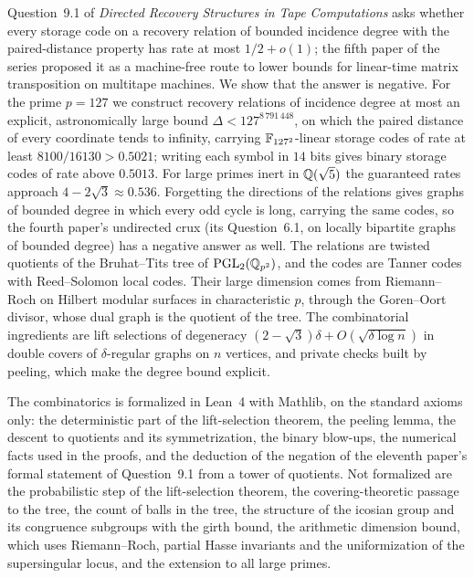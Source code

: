 Question~9.1 of \emph{Directed Recovery Structures in Tape Computations} asks whether every storage code on a recovery
relation of bounded incidence degree with the paired-distance property has rate at most $1/2+o(1)$; the fifth paper of
the series proposed it as a machine-free route to lower bounds for linear-time matrix transposition on multitape
machines. We show that the answer is negative. For the prime $p=127$ we construct recovery relations of incidence degree at
most an explicit, astronomically large bound $\Delta<127^{8\,791\,448}$, on which the paired distance of every coordinate
tends to infinity, carrying $\mathbb{F}_{127^2}$-linear storage codes of rate at least $8100/16130>0.5021$; writing each symbol in
$14$ bits gives binary storage codes of rate above $0.5013$. For large primes inert in $\mathbb{Q}(\sqrt5)$ the guaranteed rates
approach $4-2\sqrt3\approx0.536$. Forgetting the directions of the relations gives graphs of bounded degree in which every odd
cycle is long, carrying the same codes, so the fourth paper's undirected crux (its Question~6.1, on locally bipartite graphs of bounded
degree) has a negative answer as well. The relations are twisted quotients of the Bruhat--Tits tree of $\operatorname{PGL}_2(\mathbb{Q}_{p^2})$, and the codes
are Tanner codes with Reed--Solomon local codes. Their large dimension comes from Riemann--Roch on Hilbert modular surfaces
in characteristic $p$, through the Goren--Oort divisor, whose dual graph is the quotient of the tree. The combinatorial
ingredients are lift selections of degeneracy $(2-\sqrt3)\delta+O(\sqrt{\delta\log n})$ in double covers of $\delta$-regular
graphs on $n$ vertices, and private checks built by peeling, which make the degree bound explicit.

The combinatorics is formalized in Lean~4 with Mathlib, on the standard axioms only: the deterministic part of the
lift-selection theorem, the peeling lemma, the descent to quotients and its symmetrization, the binary blow-ups, the
numerical facts used in the proofs, and the deduction of the negation of the eleventh paper's formal statement of
Question~9.1 from a tower of quotients. Not formalized are the probabilistic step of the lift-selection theorem, the
covering-theoretic passage to the tree, the count of balls in the tree, the structure of the icosian group and its
congruence subgroups with the girth bound, the arithmetic dimension bound, which uses Riemann--Roch, partial Hasse
invariants and the uniformization of the supersingular locus, and the extension to all large primes.

